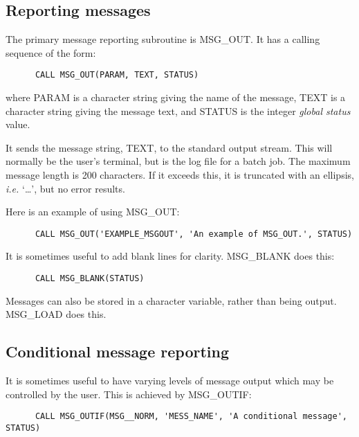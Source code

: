 \subsection {Reporting messages}

The primary message reporting subroutine is MSG\_OUT. 
It has a calling sequence of the form:

\begin{small}
\begin{verbatim}
      CALL MSG_OUT(PARAM, TEXT, STATUS)
\end{verbatim}
\end{small}

where PARAM is a character string giving the name of the message, TEXT is a
character string giving the message text, and STATUS is the integer
{\em global status} value. 

It sends the message string, TEXT, to the standard output stream. 
This will normally be the user's terminal, but is the log file for a batch job.
The maximum message length is 200 characters.
If it exceeds this, it is truncated with an ellipsis, {\em i.e.} `\ldots', but
no error results.

Here is an example of using MSG\_OUT:

\begin{small}
\begin{verbatim}
      CALL MSG_OUT('EXAMPLE_MSGOUT', 'An example of MSG_OUT.', STATUS)
\end{verbatim}
\end{small}

It is sometimes useful to add blank lines for clarity.
MSG\_BLANK does this:

\begin{small}
\begin{verbatim}
      CALL MSG_BLANK(STATUS)
\end{verbatim}
\end{small}

Messages can also be stored in a character variable, rather than being output.
MSG\_LOAD does this.

\subsection {Conditional message reporting}

It is sometimes useful to have varying levels of message output which may be
controlled by the user.
This is achieved by MSG\_OUTIF:

\begin{small}
\begin{verbatim}
      CALL MSG_OUTIF(MSG__NORM, 'MESS_NAME', 'A conditional message', STATUS)
\end{verbatim}
\end{small}


